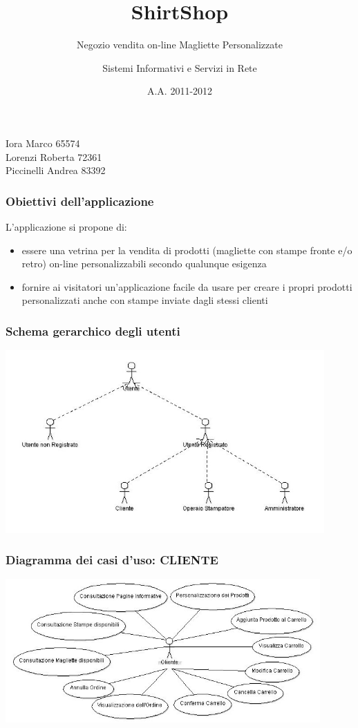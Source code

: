 \documentclass[10pt]{beamer}
\title{\textbf{ShirtShop}}
\subtitle{Negozio vendita on-line Magliette Personalizzate}
\author{Sistemi Informativi e Servizi in Rete}
\date{A.A. 2011-2012}
\begin{document}
\begin{frame}
	\maketitle
	Iora Marco 65574\\ Lorenzi Roberta 72361 \\ Piccinelli Andrea 83392\\
\end{frame}

\begin{frame}
	\frametitle{Obiettivi dell'applicazione}
	L'applicazione si propone di:
	\begin{itemize}
		\item <1-> essere una vetrina per la vendita di prodotti (magliette con stampe fronte e/o retro)
		on-line personalizzabili secondo qualunque esigenza
		\item <2-> fornire ai visitatori un'applicazione facile da usare per creare i propri prodotti
		personalizzati anche con stampe inviate dagli stessi clienti 
	\end{itemize}
\end{frame}

\begin{frame}
	\frametitle{Schema gerarchico degli utenti}
	\includegraphics[height= 7cm]{Immagine/GerarchiaUtenti.jpg}
\end{frame}

\begin{frame}
	\frametitle{Diagramma dei casi d'uso: CLIENTE}
	\includegraphics[height=5.5cm]{Immagine/CasoCliente.jpg}
\end{frame}
\end{document}
